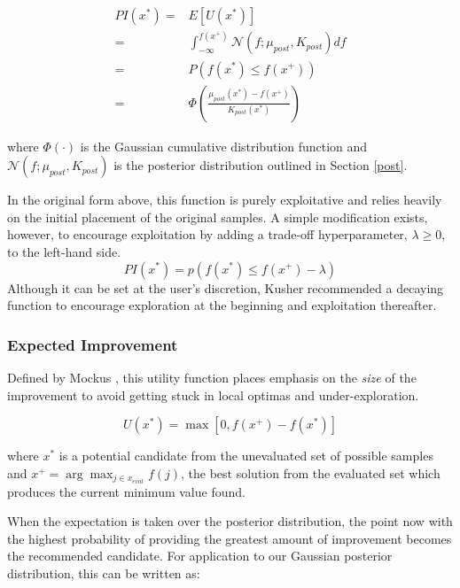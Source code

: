 \begin{equation}
\begin{split}
PI(x^\ast) = & E[U(x^\ast)] \\
= & \int_{-\infty}^{f(x^+)} \mathcal{N}\left(f;\mu_{post},K_{post}\right) df\\
= & P(f(x^\ast) \le f(x^+))  \\
= & \Phi \left(\frac{\mu_{post}(x^\ast) - f(x^+)}{K_{post}(x^\ast)}\right)
\end{split}
\end{equation}

where $\Phi(\cdot)$ is the Gaussian cumulative distribution function and $\mathcal{N}\left(f;\mu_{post},K_{post}\right)$ is the posterior distribution outlined in Section \ref{post}.

In the original form above, this function is purely exploitative and relies heavily on the initial placement of the original samples. A simple modification exists, however, to encourage exploitation by adding a trade-off hyperparameter, $\lambda \ge 0$, to the left-hand side.
\begin{equation}
PI(x^\ast) = p(f(x^\ast) \le f(x^+) - \lambda)
\end{equation}
Although it can be set at the user's discretion, Kusher recommended a decaying function to encourage exploration at the beginning and exploitation thereafter. 

\subsubsection{Expected Improvement}
Defined by Mockus \cite{mockus_application_1978}, this utility function places emphasis on the \textit{size} of the improvement to avoid getting stuck in local optimas and under-exploration. 

\begin{equation}
U(x^\ast) = \max [0, f(x^+) - f(x^\ast)]
\end{equation}

where $x^\ast$ is a potential candidate from the unevaluated set of possible samples and $x^+ = \arg \max_{j \in x_{eval}} f(j)$, the best solution from the evaluated set which produces the current minimum value found.

When the expectation is taken over the posterior distribution, the point now with the highest probability of providing the greatest amount of improvement becomes the recommended candidate. For application to our Gaussian posterior distribution, this can be written as:

